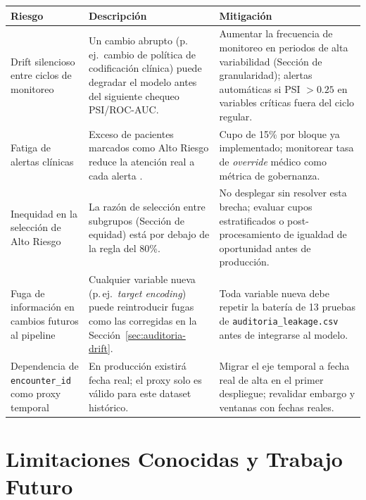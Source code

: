 \documentclass[11pt,a4paper]{article}
\begin{document}
\begin{longtable}{p{3.2cm}p{5cm}p{5.3cm}}
\toprule
\textbf{Riesgo} & \textbf{Descripción} & \textbf{Mitigación} \\
\midrule
\endhead
Drift silencioso entre ciclos de monitoreo & Un cambio abrupto (p.\,ej.\ cambio de política de codificación clínica) puede degradar el modelo antes del siguiente chequeo PSI/ROC-AUC. & Aumentar la frecuencia de monitoreo en periodos de alta variabilidad (Sección de granularidad); alertas automáticas si PSI $>0.25$ en variables críticas fuera del ciclo regular. \\
Fatiga de alertas clínicas & Exceso de pacientes marcados como Alto Riesgo reduce la atención real a cada alerta \cite{vandersijs2006,ancker2017}. & Cupo de 15\% por bloque ya implementado; monitorear tasa de \emph{override} médico como métrica de gobernanza. \\
Inequidad en la selección de Alto Riesgo & La razón de selección entre subgrupos (Sección de equidad) está por debajo de la regla del 80\%. & No desplegar sin resolver esta brecha; evaluar cupos estratificados o post-procesamiento de igualdad de oportunidad \cite{hardt2016} antes de producción. \\
Fuga de información en cambios futuros al pipeline & Cualquier variable nueva (p.\,ej.\ \emph{target encoding}) puede reintroducir fugas como las corregidas en la Sección~\ref{sec:auditoria-drift}. & Toda variable nueva debe repetir la batería de 13 pruebas de \texttt{auditoria\_leakage.csv} antes de integrarse al modelo. \\
Dependencia de \texttt{encounter\_id} como proxy temporal & En producción existirá fecha real; el proxy solo es válido para este dataset histórico. & Migrar el eje temporal a fecha real de alta en el primer despliegue; revalidar embargo y ventanas con fechas reales. \\
\bottomrule
\end{longtable}

\section{Limitaciones Conocidas y Trabajo Futuro}
\end{document}
